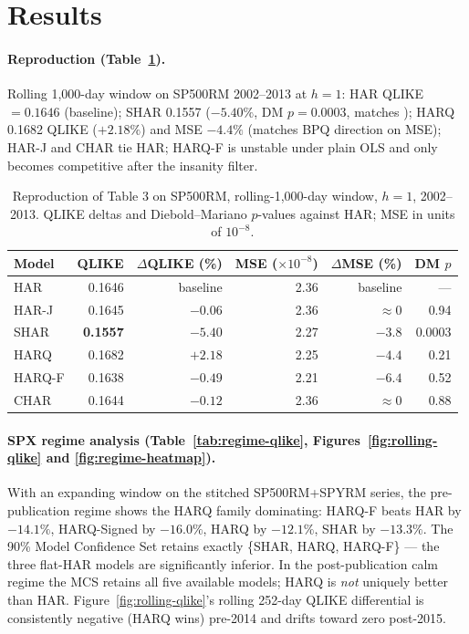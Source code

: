 \documentclass[10pt,letterpaper]{article}
\begin{document}
\section{Results}
\paragraph{Reproduction (Table~\ref{tab:repro}).} Rolling 1{,}000-day window on SP500RM 2002--2013 at $h = 1$: HAR QLIKE $= 0.1646$ (baseline); SHAR 0.1557 ($-5.40\%$, DM $p = 0.0003$, matches \citealp{pattonsheppard2015}); HARQ 0.1682 QLIKE ($+2.18\%$) and MSE $-4.4\%$ (matches BPQ direction on MSE); HAR-J and CHAR tie HAR; HARQ-F is unstable under plain OLS and only becomes competitive after the insanity filter.

\begin{table}[tb]
\centering\small
\caption{Reproduction of \citet{bpq2016} Table 3 on SP500RM, rolling-1{,}000-day window, $h=1$, 2002--2013. QLIKE deltas and Diebold--Mariano $p$-values against HAR; MSE in units of $10^{-8}$.}
\label{tab:repro}
\begin{tabular}{lrrrrr}
\toprule
Model & QLIKE & $\Delta$QLIKE (\%) & MSE ($\times10^{-8}$) & $\Delta$MSE (\%) & DM $p$ \\
\midrule
HAR    & 0.1646          & baseline & 2.36 & baseline & --- \\
HAR-J  & 0.1645          & $-0.06$  & 2.36 & $\approx 0$ & 0.94 \\
SHAR   & \textbf{0.1557} & $-5.40$  & 2.27 & $-3.8$  & 0.0003 \\
HARQ   & 0.1682          & $+2.18$  & 2.25 & $-4.4$  & 0.21 \\
HARQ-F & 0.1638          & $-0.49$  & 2.21 & $-6.4$  & 0.52 \\
CHAR   & 0.1644          & $-0.12$  & 2.36 & $\approx 0$ & 0.88 \\
\bottomrule
\end{tabular}
\end{table}

\paragraph{SPX regime analysis (Table~\ref{tab:regime-qlike}, Figures~\ref{fig:rolling-qlike} and \ref{fig:regime-heatmap}).} With an expanding window on the stitched SP500RM+SPYRM series, the pre-publication regime shows the HARQ family dominating: HARQ-F beats HAR by $-14.1\%$, HARQ-Signed by $-16.0\%$, HARQ by $-12.1\%$, SHAR by $-13.3\%$. The 90\% Model Confidence Set retains exactly \{SHAR, HARQ, HARQ-F\} --- the three flat-HAR models are significantly inferior. In the post-publication calm regime the MCS retains all five available models; HARQ is \emph{not} uniquely better than HAR. Figure~\ref{fig:rolling-qlike}'s rolling 252-day QLIKE differential is consistently negative (HARQ wins) pre-2014 and drifts toward zero post-2015.
\end{document}
